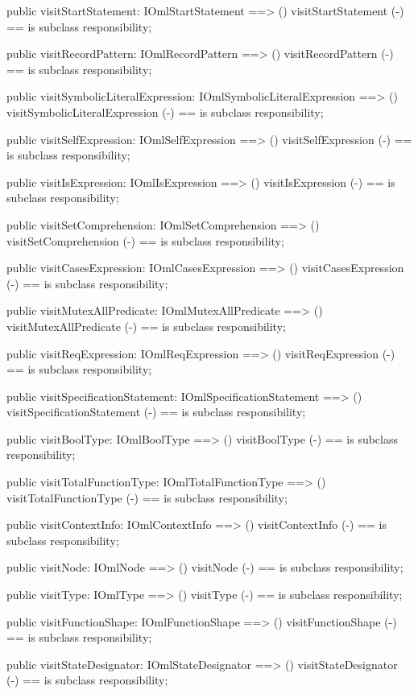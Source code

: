 \begin{vdm_al}
  public visitStartStatement: IOmlStartStatement ==> ()
  visitStartStatement (-) == is subclass responsibility;

  public visitRecordPattern: IOmlRecordPattern ==> ()
  visitRecordPattern (-) == is subclass responsibility;

  public visitSymbolicLiteralExpression: IOmlSymbolicLiteralExpression ==> ()
  visitSymbolicLiteralExpression (-) == is subclass responsibility;

  public visitSelfExpression: IOmlSelfExpression ==> ()
  visitSelfExpression (-) == is subclass responsibility;

  public visitIsExpression: IOmlIsExpression ==> ()
  visitIsExpression (-) == is subclass responsibility;

  public visitSetComprehension: IOmlSetComprehension ==> ()
  visitSetComprehension (-) == is subclass responsibility;

  public visitCasesExpression: IOmlCasesExpression ==> ()
  visitCasesExpression (-) == is subclass responsibility;

  public visitMutexAllPredicate: IOmlMutexAllPredicate ==> ()
  visitMutexAllPredicate (-) == is subclass responsibility;

  public visitReqExpression: IOmlReqExpression ==> ()
  visitReqExpression (-) == is subclass responsibility;

  public visitSpecificationStatement: IOmlSpecificationStatement ==> ()
  visitSpecificationStatement (-) == is subclass responsibility;

  public visitBoolType: IOmlBoolType ==> ()
  visitBoolType (-) == is subclass responsibility;

  public visitTotalFunctionType: IOmlTotalFunctionType ==> ()
  visitTotalFunctionType (-) == is subclass responsibility;

  public visitContextInfo: IOmlContextInfo ==> ()
  visitContextInfo (-) == is subclass responsibility;

  public visitNode: IOmlNode ==> ()
  visitNode (-) == is subclass responsibility;

  public visitType: IOmlType ==> ()
  visitType (-) == is subclass responsibility;

  public visitFunctionShape: IOmlFunctionShape ==> ()
  visitFunctionShape (-) == is subclass responsibility;

  public visitStateDesignator: IOmlStateDesignator ==> ()
  visitStateDesignator (-) == is subclass responsibility;


\end{vdm_al}
